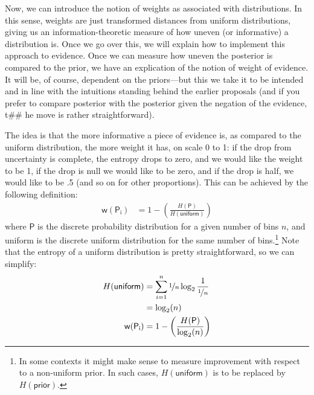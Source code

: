 \documentclass[
  10pt,
  dvipsnames,enabledeprecatedfontcommands]{scrartcl}
\begin{document}
Now, we can introduce the notion of weights as associated with
distributions. In this sense, weights are just transformed distances
from uniform distributions, giving us an information-theoretic measure
of how uneven (or informative) a distribution is. Once we go over this,
we will explain how to implement this approach to evidence. Once we can
measure how uneven the posterior is compared to the prior, we have an
explication of the notion of weight of evidence. It will be, of course,
dependent on the priors---but this we take it to be intended and in line
with the intuitions standing behind the earlier proposals (and if you
prefer to compare posterior with the posterior given the negation of the
evidence, t\#\# he move is rather straightforward).

The idea is that the more informative a piece of evidence is, as
compared to the uniform distribution, the more weight it has, on scale 0
to 1: if the drop from uncertainty is complete, the entropy drops to
zero, and we would like the weight to be 1, if the drop is null we would
like to be zero, and if the drop is half, we would like to be .5 (and so
on for other proportions). This can be achieved by the following
definition: \begin{align*}
\mathsf{w(P_i)} & = 1 - \left( \frac{H(\mathsf{P})}{H(\mathsf{uniform})}\right)
\end{align*} \noindent where \(\mathsf{P}\) is the discrete probability
distribution for a given number of bins \(n\), and uniform is the
discrete uniform distribution for the same number of bins.\footnote{In
  some contexts it might make sense to measure improvement with respect
  to a non-uniform prior. In such cases, \(H(\mathsf{uniform})\) is to
  be replaced by \(H(\mathsf{prior})\).} Note that the entropy of a
uniform distribution is pretty straightforward, so we can simplify:
\begin{align*}
H(\mathsf{uniform}) & = \sum_{i=1}^n \nicefrac{1}{n} \log_2 \frac{1}{\nicefrac{1}{n}} \\
& = \log_2(n) \\
\mathsf{w(P_i)} & = 1 - \left( \frac{H(\mathsf{P})}{\log_2(n)}\right)
\end{align*}
\end{document}
